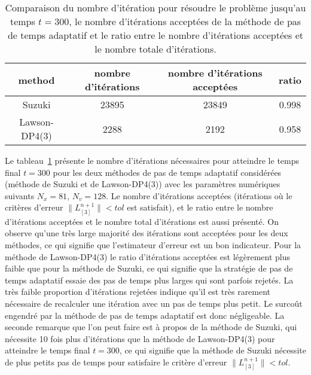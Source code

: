 \begin{table}[h]
	\centering
	\begin{tabular}{c|c|c|c}
      method              & nombre d'itérations & nombre d'itérations acceptées & ratio \\
      \hline
      Suzuki              & 23895                & 23849                        & 0.998 \\
      Lawson-DP4(3)       & 2288                 & 2192                         & 0.958 \\
	\end{tabular}
	\caption{Comparaison du nombre d'itération pour résoudre le problème jusqu'au temps $t=300$, le nombre d'itérations acceptées de la méthode de pas de temps adaptatif et le ratio entre le nombre d'itérations acceptées et le nombre totale d'itérations.}
	\label{tab:compare:iteration}
\end{table}

Le tableau~\ref{tab:compare:iteration} présente le nombre d'itérations nécessaires pour atteindre le temps final $t=300$ pour les deux méthodes de pas de temps adaptatif considérées (méthode de Suzuki et de Lawson-DP4(3)) avec les paramètres numériques suivants $N_x=81$, $N_v=128$. Le nombre d'itérations acceptées (itérations où le critères d'erreur $\|L_{[3]}^{n+1}\|<tol$ est satisfait), et le ratio entre le nombre d'itérations acceptées et le nombre total d'itérations est aussi présenté. On observe qu'une très large majorité des itérations sont acceptées pour les deux méthodes, ce qui signifie que l'estimateur d'erreur est un bon indicateur. Pour la méthode de Lawson-DP4(3) le ratio d'itérations acceptées est légèrement plus faible que pour la méthode de Suzuki, ce qui signifie que la stratégie de pas de temps adaptatif essaie des pas de temps plus larges qui sont parfois rejetés. La très faible proportion d'itérations rejetées indique qu'il est très rarement nécessaire de recalculer une itération avec un pas de temps plus petit. Le surcoût engendré par la méthode de pas de temps adaptatif est donc négligeable. La seconde remarque que l'on peut faire est à propos de la méthode de Suzuki, qui nécessite 10 fois plus d'itérations que la méthode de Lawson-DP4(3) pour atteindre le temps final $t=300$, ce qui signifie que la méthode de Suzuki nécessite de plus petits pas de temps pour satisfaire le critère d'erreur $\|L_{[3]}^{n+1}\|<tol$.

